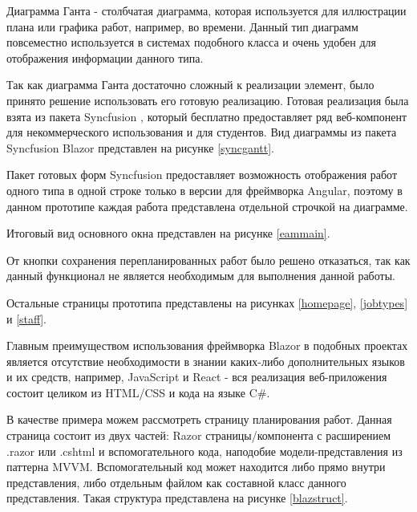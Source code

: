 Диаграмма Ганта - столбчатая диаграмма, которая используется для иллюстрации плана или графика работ, например, во времени. Данный тип диаграмм повсеместно используется в системах подобного класса и очень удобен для отображения информации данного типа.

Так как диаграмма Ганта достаточно сложный к реализации элемент, было принято решение использовать его готовую реализацию. Готовая реализация была взята из пакета Syncfusion \cite{syncblazor}, который бесплатно предоставляет ряд веб-компонент для некоммерческого использования и для студентов. Вид диаграммы из пакета Syncfusion Blazor представлен на рисунке \ref{syncgantt}.


Пакет готовых форм Syncfusion предоставляет возможность отображения работ одного типа в одной строке только в версии для фреймворка Angular, поэтому в данном прототипе каждая работа представлена отдельной строчкой на диаграмме.

Итоговый вид основного окна представлен на рисунке \ref{eammain}.


От кнопки сохранения перепланированных работ было решено отказаться, так как данный функционал не является необходимым для выполнения данной работы.

Остальные страницы прототипа представлены на рисунках \ref{homepage}, \ref{jobtypes} и \ref{staff}.




Главным преимуществом использования фреймворка Blazor в подобных проектах является отсутствие необходимости в знании каких-либо дополнительных языков и их средств, например, JavaScript и React - вся реализация веб-приложения состоит целиком из HTML/CSS и кода на языке C\#.

В качестве примера можем рассмотреть страницу планирования работ. Данная страница состоит из двух частей: Razor страницы/компонента с расширением .razor или .cshtml и вспомогательного кода, наподобие модели-представления из паттерна MVVM. Вспомогательный код может находится либо прямо внутри представления, либо отдельным файлом как составной класс данного представления. Такая структура представлена на рисунке \ref{blazstruct}.

